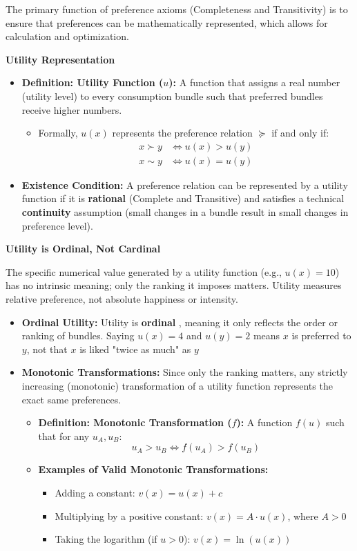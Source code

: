 \documentclass{article}
\begin{document}
The primary function of preference axioms (Completeness and Transitivity) is to ensure that preferences can be mathematically represented, which allows for calculation and optimization.

\textbf{Utility Representation}
\begin{itemize}
    \item \textbf{Definition: Utility Function ($u$):} A function that assigns a real number (utility level) to every consumption bundle such that preferred bundles receive higher numbers.
    \begin{itemize}
        \item Formally, $u(x)$ represents the preference relation $\succeq$ if and only if: \begin{align*} x \succ y &\iff u(x) > u(y) \\ x \sim y &\iff u(x) = u(y) \end{align*}
    \end{itemize}
    \item \textbf{Existence Condition:} A preference relation can be represented by a utility function if it is \textbf{rational} (Complete and Transitive) and satisfies a technical \textbf{continuity} assumption (small changes in a bundle result in small changes in preference level).
\end{itemize}

\textbf{Utility is Ordinal, Not Cardinal}

The specific numerical value generated by a utility function (e.g., $u(x)=10$) has no intrinsic meaning; only the ranking it imposes matters. Utility measures relative preference, not absolute happiness or intensity.

\begin{itemize}
    \item \textbf{Ordinal Utility:} Utility is \textbf{ordinal} , meaning it only reflects the order or ranking of bundles. Saying $u(x)=4$ and $u(y)=2$ means $x$ is preferred to $y$, not that $x$ is liked "twice as much" as $y$
    \item \textbf{Monotonic Transformations:} Since only the ranking matters, any strictly increasing (monotonic) transformation of a utility function represents the exact same preferences.
    \begin{itemize}
        \item \textbf{Definition: Monotonic Transformation ($f$):} A function $f(u)$ such that for any $u_A, u_B$: \[u_A > u_B \iff f(u_A) > f(u_B)\]
        \item \textbf{Examples of Valid Monotonic Transformations:}
        \begin{itemize}
            \item Adding a constant: $v(x) = u(x) + c$
            \item Multiplying by a positive constant: $v(x) = A \cdot u(x)$, where $A > 0$
            \item Taking the logarithm (if $u > 0$): $v(x) = \ln(u(x))$
        \end{itemize}
    \end{itemize}
\end{itemize}
\end{document}
